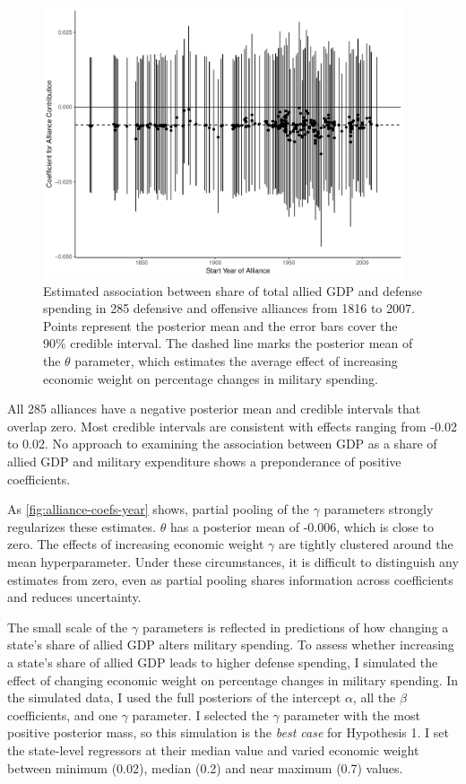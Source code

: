 \documentclass[12pt]{article}
\begin{document}
\begin{figure}[htbp]
	\centering
		\includegraphics[width=0.95\textwidth]{alliance-coefs-year.pdf}
	\caption{Estimated association between share of total allied GDP and defense spending in 285 defensive and offensive alliances from 1816 to 2007. Points represent the posterior mean and the error bars cover the 90\% credible interval. The dashed line marks the posterior mean of the $\theta$ parameter, which estimates the average effect of increasing economic weight on percentage changes in military spending.}
	\label{fig:alliance-coefs-year}
\end{figure}


All 285 alliances have a negative posterior mean and credible intervals that overlap zero. 
Most credible intervals are consistent with effects ranging from -0.02 to 0.02. 
No approach to examining the association between GDP as a share of allied GDP and military expenditure shows a preponderance of positive coefficients. 


As \autoref{fig:alliance-coefs-year} shows, partial pooling of the $\gamma$ parameters strongly regularizes these estimates. 
$\theta$ has a posterior mean of -0.006, which is close to zero. 
The effects of increasing economic weight $\gamma$ are tightly clustered around the mean hyperparameter. 
Under these circumstances, it is difficult to distinguish any estimates from zero, even as partial pooling shares information across coefficients and reduces uncertainty. 


The small scale of the $\gamma$ parameters is reflected in predictions of how changing a state's share of allied GDP alters military spending. 
To assess whether increasing a state's share of allied GDP leads to higher defense spending, I simulated the effect of changing economic weight on percentage changes in military spending. 
In the simulated data, I used the full posteriors of the intercept $\alpha$, all the $\beta$ coefficients, and one $\gamma$ parameter. 
I selected the $\gamma$ parameter with the most positive posterior mass, so this simulation is the \emph{best case} for Hypothesis 1. 
I set the state-level regressors at their median value and varied economic weight between minimum (0.02), median (0.2) and near maximum (0.7) values. 
\end{document}
